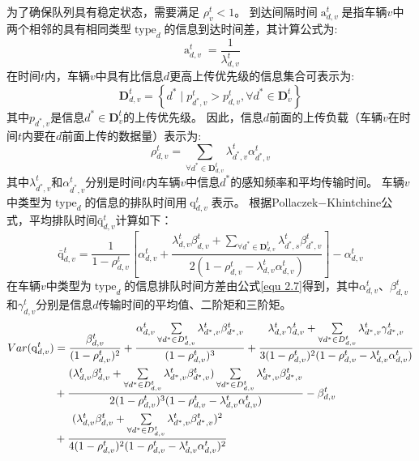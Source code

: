 为了确保队列具有稳定状态，需要满足 $\rho_{v}^{t} < 1$。
到达间隔时间$\operatorname{a}_{d, v}^t$是指车辆$v$中两个相邻的具有相同类型$\operatorname{type}_d$的信息到达时间差，其计算公式为:
\begin{equation}
    \operatorname{a}_{d, v}^t=\frac{1}{\lambda_{d, v}^{t}}
\end{equation}
在时间$t$内，车辆$v$中具有比信息$d$更高上传优先级的信息集合可表示为:
\begin{equation}
\mathbf{D}_{d, v}^t=\left\{d^* \mid p_{d^*, v}^t>p_{d, v}^t, \forall d^* \in \mathbf{D}_v^t\right\} 
\end{equation}
其中$p_{d^*, v}$是信息$d^* \in \mathbf{D}_v^t$的上传优先级。
  因此，信息$d$前面的上传负载（车辆$v$在时间$t$内要在$d$前面上传的数据量）表示为:
\begin{equation}
\rho_{d, v}^t=\sum_{\forall d^* \in \mathbf{D}_{d, v}^t} \lambda_{d^*, v}^t \alpha_{d^*, v}^t
\end{equation}
其中$\lambda_{d^*, v}^t$和$\alpha_{d^*, v}^t$分别是时间$t$内车辆$v$中信息$d^*$的感知频率和平均传输时间。
车辆$v$中类型为$\operatorname{type}_d$的信息的排队时间用$\operatorname{q}_{d, v}^t$表示。
根据Pollaczek$-$Khintchine公式\cite{takine2001queue}，平均排队时间$\operatorname{\bar{q}}_{d, v}^t$计算如下：
\begin{equation}
    \operatorname{\bar{q}}_{d, v}^t= \frac{1} {1 - \rho_{d, v}^{t}} 
        \left[ \alpha_{d, v}^t + \frac{ \lambda_{d, v}^{t} \beta_{d, v}^t + \sum\limits_{\forall d^* \in \mathbf{D}_{d, v}^t} \lambda_{d^*,s}^t \beta_{d^*, v}^t }{2\left(1-\rho_{d, v}^{t} - \lambda_{d, v}^{t}  \alpha_{d, v}^t\right)}\right] 
        - \alpha_{d, v}^t
\label{equ 2-6}
\end{equation}
在车辆$v$中类型为$\operatorname{type}_d$的信息排队时间方差由公式\ref{equ 2.7}得到，其中$\alpha_{d, v}^t$、$\beta_{d, v}^t$和$\gamma_{d, v}^t$分别是信息$d$传输时间的平均值、二阶矩和三阶矩。
\begin{align}
	{Var}(\operatorname{q}_{d, v}^t) &= \frac{\beta_{d, v}^t}{(1- \rho_{d, v}^{t})^2} + \frac{\alpha_{d, v}^t \sum\limits_{\forall d^* \in D_{d, v}^t} \lambda_{d^*, v}^t \beta_{d^*, v}^t}{(1- \rho_{d, v}^{t})^3} + \frac{\lambda_{d, v}^{t} \gamma_{d, v}^t + \sum\limits_{\forall d^* \in D_{d, v}^t} \lambda_{d^*, v}^t \gamma_{d^*, v}^t}{3(1- \rho_{d, v}^{t})^2(1-\rho_{d, v}^{t} - \lambda_{d, v}^{t}  \alpha_{d, v}^t)} \notag \\ 
	& + \frac{(\lambda_{d, v}^{t} \beta_{d, v}^t + \sum\limits_{\forall d^* \in D_{d, v}^t} \lambda_{d^*, v}^t \beta_{d^*, v}^t) \sum\limits_{\forall d^* \in D_{d, v}^t} \lambda_{d^*, v}^t \beta_{d^*, v}^t }{2(1- \rho_{d, v}^{t})^3(1-\rho_{d, v}^{t} - \lambda_{d, v}^{t}  \alpha_{d, v}^t)} - \beta_{d, v}^t \notag \\
	& + \frac{(\lambda_{d, v}^{t} \beta_{d, v}^t + \sum\limits_{\forall d^* \in D_{d, v}^t} \lambda_{d^*, v}^t \beta_{d^*, v}^t)^2}{4(1- \rho_{d, v}^{t})^2(1-\rho_{d, v}^{t} - \lambda_{d, v}^{t}  \alpha_{d, v}^t)^2}
\label{equ 2.7}
\end{align}
